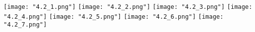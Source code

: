 \begin{center}
    \texttt{[image: "4.2\_1.png"]}
    \texttt{[image: "4.2\_2.png"]}
    \texttt{[image: "4.2\_3.png"]}
    \texttt{[image: "4.2\_4.png"]}
    \texttt{[image: "4.2\_5.png"]}
    \texttt{[image: "4.2\_6.png"]}
    \texttt{[image: "4.2\_7.png"]}
\end{center}